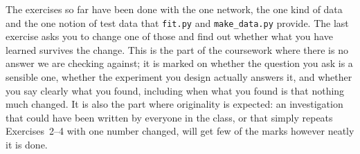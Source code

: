 \documentclass[11pt,a4paper]{article}
\newcounter{exercise}
\begin{document}
The exercises so far have been done with the one network, the one kind
of data and the one notion of test data that \texttt{fit.py} and
\texttt{make\_data.py} provide. The last exercise asks you to change
one of those and find out whether what you have learned survives the
change. This is the part of the coursework where there is no answer we
are checking against; it is marked on whether the question you ask is
a sensible one, whether the experiment you design actually answers it,
and whether you say clearly what you found, including when what you
found is that nothing much changed. It is also the part where
originality is expected: an investigation that could have been written
by everyone in the class, or that simply repeats Exercises~2--4 with
one number changed, will get few of the marks however neatly it is
done.
\end{document}
